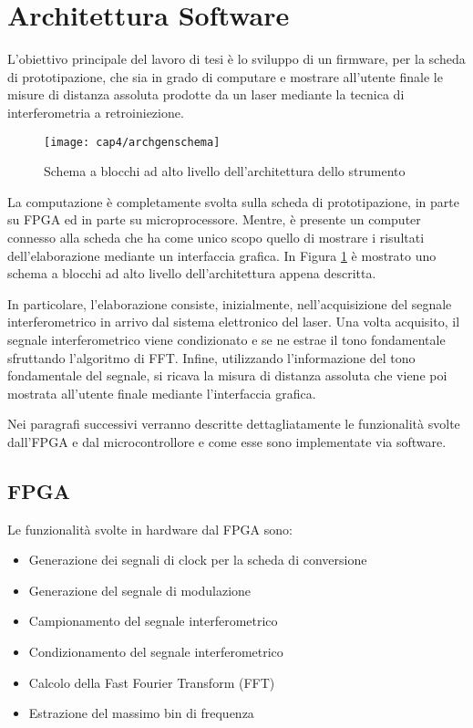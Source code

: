\section{Architettura Software}
L'obiettivo principale del lavoro di tesi è lo sviluppo di un firmware, per la scheda di prototipazione, che sia in grado di computare e mostrare all'utente finale le misure di distanza assoluta prodotte da un laser mediante la tecnica di interferometria a retroiniezione.
\begin{figure}[H]  
  \begin{center}
    \texttt{[image: cap4/archgenschema]}
    \caption{Schema a blocchi ad alto livello dell'architettura dello strumento}
    \label{archgenschema}
  \end{center}
\end{figure}

La computazione è completamente svolta sulla scheda di prototipazione, in parte su FPGA ed in parte su microprocessore. Mentre, è presente un computer connesso alla scheda che ha come unico scopo quello di mostrare i risultati dell'elaborazione mediante un interfaccia grafica. In Figura \ref{archgenschema} è mostrato uno schema a blocchi ad alto livello dell'architettura appena descritta.

In particolare, l'elaborazione consiste, inizialmente, nell'acquisizione del segnale interferometrico in arrivo dal sistema elettronico del laser. Una volta acquisito, il segnale interferometrico viene condizionato e se ne estrae il tono fondamentale sfruttando l'algoritmo di FFT. Infine, utilizzando l'informazione del tono fondamentale del segnale, si ricava la misura di distanza assoluta che viene poi mostrata all'utente finale mediante l'interfaccia grafica.

Nei paragrafi successivi verranno descritte dettagliatamente le funzionalità svolte dall'FPGA e dal microcontrollore e come esse sono implementate via software.

\subsection{FPGA}
Le funzionalità svolte in hardware dal FPGA sono:
\begin{itemize}
	\item Generazione dei segnali di clock per la scheda di conversione
	\item Generazione del segnale di modulazione
	\item Campionamento del segnale interferometrico
	\item Condizionamento del segnale interferometrico
	\item Calcolo della Fast Fourier Transform (FFT)
	\item Estrazione del massimo bin di frequenza
\end{itemize}

